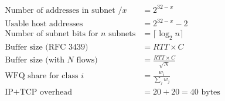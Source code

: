 \begin{formulabox}
\begin{align}
\text{Number of addresses in subnet } /x &= 2^{32-x} \\
\text{Usable host addresses} &= 2^{32-x} - 2 \\
\text{Number of subnet bits for } n \text{ subnets} &= \lceil \log_2 n \rceil \\
\text{Buffer size (RFC 3439)} &= RTT \times C \\
\text{Buffer size (with } N \text{ flows)} &= \frac{RTT \times C}{\sqrt{N}} \\
\text{WFQ share for class } i &= \frac{w_i}{\sum_j w_j} \\
\text{IP+TCP overhead} &= 20 + 20 = 40 \text{ bytes}
\end{align}
\end{formulabox}
